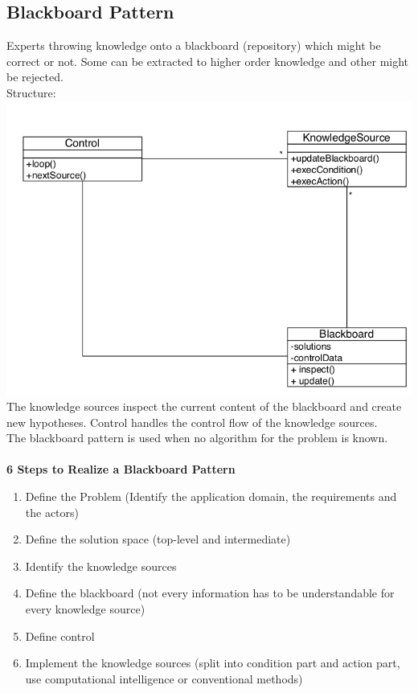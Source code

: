 \subsection{Blackboard Pattern}
Experts throwing knowledge onto a blackboard (repository) which might be correct or not. Some can be extracted to higher order knowledge and other might be rejected.\\
Structure:\\
\includegraphics[width=\linewidth]{images/pattern_blackboard.png}
The knowledge sources inspect the current content of the blackboard and create new hypotheses.
Control handles the control flow of the knowledge sources.\\
The blackboard pattern is used when no algorithm for the problem is known.\\
\\
\textbf{6 Steps to Realize a Blackboard Pattern}
\begin{enumerate}
  \item Define the Problem (Identify the application domain, the requirements and the actors)
  \item Define the solution space (top-level and intermediate)
  \item Identify the knowledge sources
  \item Define the blackboard (not every information has to be understandable for every knowledge source)
  \item Define control
  \item Implement the knowledge sources (split into condition part and action part, use computational intelligence or conventional methods)
\end{enumerate}

\newpage
